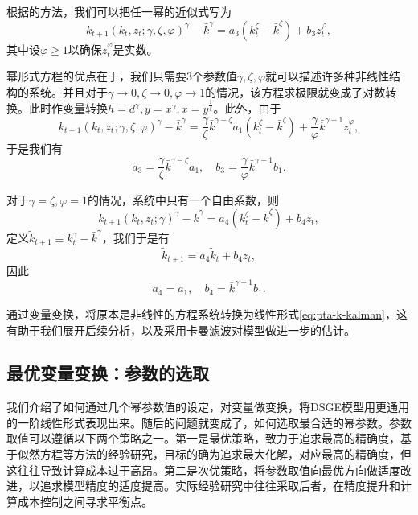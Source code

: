 根据\cite{Judd:2003xy}的方法，我们可以把任一幂的近似式写为
\begin{equation*}
  k_{t+1}(k_t,z_t;\gamma, \zeta, \varphi)^{\gamma}-\bar{k}^{\gamma} = a_3 \left( k_t^{\zeta} - \bar{k}^{\zeta} \right) + b_3 z_t^{\varphi},
\end{equation*}
其中设$\varphi \ge 1$以确保$z_t^{\varphi}$是实数。

幂形式方程的优点在于，我们只需要3个参数值$\gamma, \zeta, \varphi$就可以描述许多种非线性结构的系统。并且对于$\gamma \rightarrow 0, \zeta \rightarrow 0, \varphi \rightarrow 1$的情况，该方程求极限就变成了对数转换。此时作变量转换$h=d^{\gamma}, y=x^{\gamma}, x=y^{\frac{1}{\zeta}}$。此外，由于
\begin{equation*}
  k_{t+1}\left( k_t,z_t;\gamma, \zeta, \varphi \right)^{\gamma} - \bar{k}^{\gamma} = \frac{\gamma}{\zeta} \bar{k}^{\gamma - \zeta} a_1 \left( k_t^{\zeta} - \bar{k}^{\zeta} \right) + \frac{\gamma}{\varphi} \bar{k}^{\gamma - 1} z_t^{\varphi},
\end{equation*}
于是我们有
\begin{equation*}
  a_3 = \frac{\gamma}{\zeta} \bar{k}^{\gamma - \zeta} a_1, \quad b_3 = \frac{\gamma}{\varphi} \bar{k}^{\gamma - 1} b_1.
\end{equation*}

对于$\gamma = \zeta, \varphi = 1$的情况，系统中只有一个自由系数，则
\begin{equation*}
  k_{t+1} (k_t, z_t;\gamma)^{\gamma} - \bar{k}^{\gamma} = a_4 \left( k_t^{\zeta} - \bar{k}^{\zeta}\right) + b_4 z_t,
\end{equation*}
定义$\tilde{k}_{t+1} \equiv k_t^{\gamma} - \bar{k}^{\gamma}$，我们于是有
\begin{equation}
\label{eq:pta-k-kalman}
  \tilde{k}_{t+1} = a_4 \tilde{k}_t + b_4 z_t,
\end{equation}
因此
\begin{equation*}
  a_4 = a_1, \quad b_4 = \bar{k}^{\gamma -1} b_1.
\end{equation*}

通过变量变换，将原本是非线性的方程系统转换为线性形式\eqref{eq:pta-k-kalman}，这有助于我们展开后续分析，以及采用卡曼滤波对模型做进一步的估计。

\subsection{最优变量变换：参数的选取}
我们介绍了如何通过几个幂参数值的设定，对变量做变换，将DSGE模型用更通用的一阶线性形式表现出来。随后的问题就变成了，如何选取最合适的幂参数。参数取值可以遵循以下两个策略之一。第一是最优策略，致力于追求最高的精确度，基于似然方程等方法的经验研究，目标的确为追求最大化解，对应最高的精确度，但这往往导致计算成本过于高昂。第二是次优策略，将参数取值向最优方向做适度改进，以追求模型精度的适度提高。实际经验研究中往往采取后者，在精度提升和计算成本控制之间寻求平衡点。

